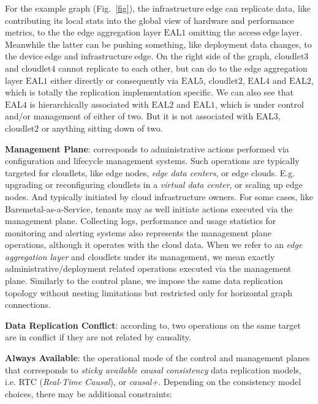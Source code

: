 \documentclass[conference]{IEEEtran}
\begin{document}
For the example graph (Fig.~\ref{fig}), the $\mathrm{infrastructure\ edge}$ can
replicate data, like contributing its local stats into the global view of
hardware and performance metrics, to the the edge aggregation layer
$\mathrm{EAL1}$ omitting the $\mathrm{access\ edge\ layer}$. Meanwhile the
latter can be pushing something, like deployment data changes, to the
$\mathrm{device\ edge}$ and $\mathrm{infrastructure\ edge}$. On the right side
of the graph, $\mathrm{cloudlet3}$ and $\mathrm{cloudlet4}$ cannot replicate to
each other, but can do to the edge aggregation layer $\mathrm{EAL1}$ either
directly or consequently via $\mathrm{EAL5}$, $\mathrm{cloudlet2}$,
$\mathrm{EAL4}$ and $\mathrm{EAL2}$, which is totally the replication
implementation specific. We can also see that $\mathrm{EAL4}$ is
hierarchically associated with $\mathrm{EAL2}$ and $\mathrm{EAL1}$, which is
under control and/or management of either of two. But it is not associated with
$\mathrm{EAL3}$, $\mathrm{cloudlet2}$ or anything sitting down of two.

\textbf{Management Plane}: corresponds to administrative actions performed via
configuration and lifecycle management systems. Such operations are typically
targeted for cloudlets, like edge nodes, \textit{edge data centers}\cite{b3},
or edge clouds. E.g. upgrading or reconfiguring cloudlets in a \textit{virtual
data center}\cite{b3}, or scaling up edge nodes. And typically initiated by
cloud infrastructure owners. For some cases, like Baremetal-as-a-Service,
tenants may as well initiate actions executed via the management plane.
Collecting logs, performance and usage statistics for monitoring and alerting
systems also represents the management plane operations, although it operates
with the cloud data. When we refer to an \textit{edge aggregation
layer}\cite{b3} and cloudlets under its management, we mean exactly
administrative/deployment related operations executed via the management plane.
Similarly to the control plane, we impose the same data replication topology
without nesting limitations but restricted only for horizontal graph
connections.

\textbf{Data Replication Conflict}: according to\cite{b1}, two operations on
the same target are in conflict if they are not related by causality.

\textbf{Always Available}: the operational mode of the control and management
planes that corresponds to \textit{sticky available causal
consistency}\cite{b4} data replication models, i.e. RTC (\textit{Real-Time
Causal}\cite{b2}), or \textit{causal+}\cite{b1}. Depending on the consistency
model choices, there may be additional constraints:
\end{document}
